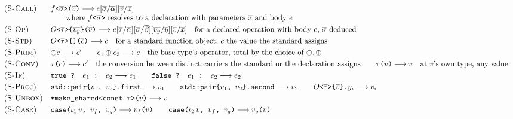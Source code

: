 \begin{figure}[htbp]
\footnotesize
\[
\begin{array}{ll}
\textsc{(S-Call)} & f\texttt{<}\overline{\sigma}\texttt{>(}\overline{v}\texttt{)} \longrightarrow e[\overline{\sigma}/\overline{\alpha}][\overline{v}/\overline{x}] \\
 & \qquad \text{where } f\texttt{<}\overline{\sigma}\texttt{>} \text{ resolves to a declaration with parameters } \overline{x} \text{ and body } e \\[3pt]
\textsc{(S-Op)} & O\texttt{<}\overline{\tau}\texttt{>\{}\overline{v_y}\texttt{\}(}\overline{v}\texttt{)} \longrightarrow e[\overline{\tau}/\overline{\alpha}][\overline{\sigma}/\overline{\beta}][\overline{v_y}/\overline{y}][\overline{v}/\overline{x}] \quad \text{for a declared operation with body } e\text{, } \overline{\sigma} \text{ deduced} \\[3pt]
\textsc{(S-Std)} & O\texttt{<}\overline{\tau}\texttt{>\{\}(}\overline{c}\texttt{)} \longrightarrow c \quad \text{for a standard function object, } c \text{ the value the standard assigns} \\[3pt]
\textsc{(S-Prim)} & \ominus c \longrightarrow c' \qquad c_1 \oplus c_2 \longrightarrow c \quad \text{the base type's operator, total by the choice of } \ominus, \oplus \\[3pt]
\textsc{(S-Conv)} & \tau\texttt{(}c\texttt{)} \longrightarrow c' \quad \text{the conversion between distinct carriers the standard or the declaration assigns} \qquad \tau\texttt{(}v\texttt{)} \longrightarrow v \quad \text{at } v\text{'s own type, any value} \\[3pt]
\textsc{(S-If)} & \texttt{true ? } e_1 \texttt{ : } e_2 \longrightarrow e_1 \qquad \texttt{false ? } e_1 \texttt{ : } e_2 \longrightarrow e_2 \\[3pt]
\textsc{(S-Proj)} & \texttt{std::pair\{}v_1\texttt{, }v_2\texttt{\}.first} \longrightarrow v_1 \qquad \texttt{std::pair\{}v_1\texttt{, }v_2\texttt{\}.second} \longrightarrow v_2 \qquad O\texttt{<}\overline{\tau}\texttt{>\{}\overline{v}\texttt{\}.}y_i \longrightarrow v_i \\[3pt]
\textsc{(S-Unbox)} & \texttt{*make\_shared<const }\tau\texttt{>(}v\texttt{)} \longrightarrow v \\[3pt]
\textsc{(S-Case)} & \texttt{case(}\iota_1\,v\texttt{, }v_f\texttt{, }v_g\texttt{)} \longrightarrow v_f\texttt{(}v\texttt{)} \qquad \texttt{case(}\iota_2\,v\texttt{, }v_f\texttt{, }v_g\texttt{)} \longrightarrow v_g\texttt{(}v\texttt{)} \\[3pt]

\end{array}\]
\end{figure}
